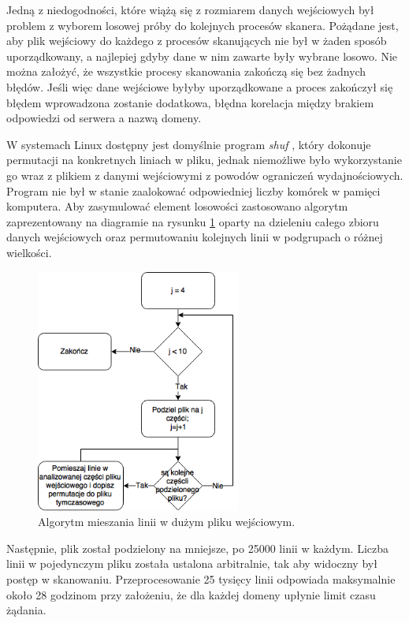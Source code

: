 Jedną z niedogodności, które wiążą się z rozmiarem danych wejściowych był problem z wyborem losowej próby do kolejnych procesów
skanera. Pożądane jest, aby plik wejściowy do każdego z procesów skanujących nie był w żaden sposób uporządkowany, a najlepiej
gdyby dane w nim zawarte były wybrane losowo. Nie można założyć, że wszystkie procesy skanowania zakończą się bez żadnych błędów.
Jeśli więc dane wejściowe byłyby uporządkowane a proces zakończył się błędem wprowadzona zostanie dodatkowa, błędna korelacja między
brakiem odpowiedzi od serwera a nazwą domeny.

W systemach Linux dostępny jest domyślnie program \textit{shuf} \cite{shuf}, który dokonuje permutacji na konkretnych liniach w pliku,
jednak niemożliwe było wykorzystanie go wraz z plikiem z danymi wejściowymi z powodów ograniczeń wydajnościowych. Program nie był w
stanie zaalokować odpowiedniej liczby komórek w pamięci komputera. Aby zasymulować element losowości zastosowano algorytm zaprezentowany
na diagramie na rysunku \ref{fig:shufAlgorithm} oparty na dzieleniu całego zbioru danych wejściowych oraz permutowaniu kolejnych linii
w podgrupach o różnej wielkości.

\begin{figure}[ht]
	\centering
	\includegraphics[width=0.6\textwidth]{image/sfuh}
	\caption{Algorytm mieszania linii w dużym pliku wejściowym.}
	\label{fig:shufAlgorithm}
\end{figure}

Następnie, plik został podzielony na mniejsze, po 25000 linii w każdym. Liczba linii w pojedynczym pliku została ustalona arbitralnie,
tak aby widoczny był postęp w skanowaniu. Przeprocesowanie 25 tysięcy linii odpowiada maksymalnie około 28 godzinom przy założeniu,
że dla każdej domeny upłynie limit czasu żądania.

